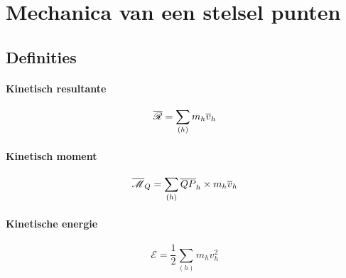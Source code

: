 \section{Mechanica van een stelsel punten}

\subsection{Definities}

\paragraph{Kinetisch resultante}
\[
  \overline{\mathscr{R}} = \sum_{(h)} m_h \overline{v}_h
\]
\paragraph{Kinetisch moment}
\[
  \overline{\mathscr{M}}_Q = \sum_{(h)} \overline{QP}_h \times m_h\overline{v}_h
\]
\paragraph{Kinetische energie}
\[
  \mathscr{E} = \frac{1}{2}\sum_{(h)} m_h v_h^2
\]
